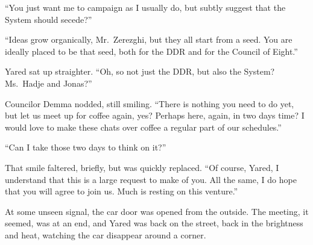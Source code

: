 ``You just want me to campaign as I usually do, but subtly suggest that the System should secede?''

``Ideas grow organically, Mr.~Zerezghi, but they all start from a seed. You are ideally placed to be that seed, both for the DDR and for the Council of Eight.''

Yared sat up straighter. ``Oh, so not just the DDR, but also the System? Ms.~Hadje and Jonas?''

Councilor Demma nodded, still smiling. ``There is nothing you need to do yet, but let us meet up for coffee again, yes? Perhaps here, again, in two days time? I would love to make these chats over coffee a regular part of our schedules.''

``Can I take those two days to think on it?''

That smile faltered, briefly, but was quickly replaced. ``Of course, Yared, I understand that this is a large request to make of you. All the same, I do hope that you will agree to join us. Much is resting on this venture.''

At some unseen signal, the car door was opened from the outside. The meeting, it seemed, was at an end, and Yared was back on the street, back in the brightness and heat, watching the car disappear around a corner.
